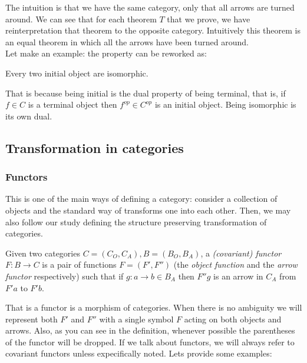 The intuition is that we have the same category, only that all arrows are turned around. We can see that  for each theorem $T$ that we prove, we have reinterpretation that theorem to the opposite category. Intuitively this theorem is an equal theorem in which all the arrows have been turned around. \\

Let make an example: the property\label{terminal-proposition} can be reworked as:

\begin{proposition}
  Every two initial object are isomorphic.
\end{proposition}


That is because being initial is the dual property of being terminal, that is, if $f\in C$ is a terminal object then $f^{op}\in C^{op}$ is an initial object. Being isomorphic is its own dual.
\subsection{Transformation in categories}




\subsubsection{Functors}
This is one of the main ways of defining a category: consider a collection of objects and the standard way of transforms one into each other. Then, we may also follow our study defining the structure preserving transformation of categories.

\begin{definition}
  Given two categories $C=(C_O, C_A), B=(B_O, B_A)$, a \emph{(covariant) functor} $F: B \to C$ is a pair of functions $F=(F',F'')$ (the \emph{object function} and the \emph{arrow functor} respectively)  such that if $g:a\to b \in B_A$ then $F''g$ is an arrow in $C_A$ from $F'a$ to $F'b$.

\end{definition}


That is a functor is a morphism of categories. When there is no ambiguity we will represent both $F'$ and $F''$ with a single symbol $F$ acting on both objects and arrows. Also, as you can see in the definition, whenever possible the parentheses of the functor will be dropped. If we talk about functors, we will always refer to covariant functors unless expecifically noted.  Lets provide some examples:\\

